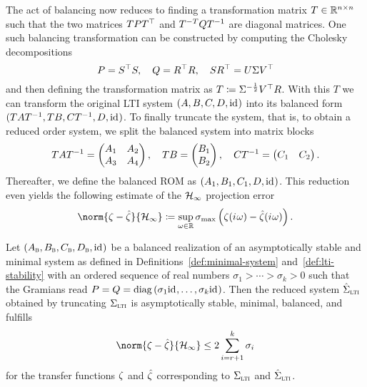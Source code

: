The act of balancing now reduces to finding a transformation matrix $T \in \mathbb{R}^{n \times n}$ such that the two matrices $T P T^{\top}$ and $T\inv[T] Q T\inv$ are diagonal matrices.
One such balancing transformation can be constructed by computing the Cholesky decompositions
\begin{equation}\label{eq:balancing}
    P = S^{\top} S,\quad Q = R^{\top} R,\quad S R^{\top} = U \Sigma V^{\top}
\end{equation}
and then defining the transformation matrix as $T \coloneqq \Sigma\inv[\frac{1}{2}] V\trans R$.
With this $T$ we can transform the original \ac{LTI} system $(A, B, C, D, \text{id}_{})$ into its balanced form $(T A T\inv, T B, C T\inv, D, \id)$.
To finally truncate the system, that is, to obtain a reduced order system, we split the balanced system into matrix blocks
\begin{equation*}
    T A T\inv = \begin{pmatrix}
        A_1 & A_2 \\
        A_3 & A_4
    \end{pmatrix},\quad T B = \begin{pmatrix}
        B_1 \\
        B_2
    \end{pmatrix},\quad C T\inv = \begin{pmatrix}
        C_1 & C_2
    \end{pmatrix}.
\end{equation*}
Thereafter, we define the balanced \ac{ROM} as $(A_1, B_1, C_1, D, \text{id}_{})$.
This reduction even yields the following estimate of the $\mathcal{H}_\infty$ projection error
\begin{equation*}
	\norm{\tfunc - \hat{\tfunc}}{\mcl{H}_\infty} \coloneqq \sup\limits_{\omega \in \bb{R}} \sigma_{\max} \left( \tfunc(\iu \omega) - \hat{\tfunc}(\iu \omega) \right).
\end{equation*}

\begin{theorem}
    Let $(A_{\textnormal{\scshape b}}, B_{\textnormal{\scshape b}}, C_{\textnormal{\scshape b}}, D_{\textnormal{\scshape b}}, \text{id}_{})$ be a balanced realization of an asymptotically stable and minimal system as defined in Definitions~\ref{def:minimal-system} and~\ref{def:lti-stability} with an ordered sequence of real numbers $\sigma_1 > \cdots > \sigma_k > 0$ such that the Gramians read $P = Q = \mathop{}\!\mathrm{diag}\left(\sigma_1 \text{id}_{}, \dots, \sigma_k \text{id}_{}\right)$.
    Then the reduced system $\hat{\Sigma}_{\textnormal{\scshape lti}}$ obtained by truncating $\Sigma_{\textnormal{\scshape lti}}$ is asymptotically stable, minimal, balanced, and fulfills
    \begin{equation*}
        \norm{\tfunc - \hat{\tfunc}}{\mcl{H}_\infty} \leq 2 \sum\limits_{i = r + 1}^k \sigma_i
    \end{equation*}
    for the transfer functions $\zeta$ and $\hat{\zeta}$ corresponding to $\Sigma_{\textnormal{\scshape lti}}$ and $\hat{\Sigma}_{\textnormal{\scshape lti}}$.
\end{theorem}

